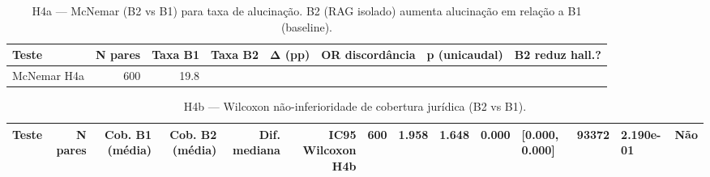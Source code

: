 \begin{table}[htbp]
\centering
\caption{H4a — McNemar (B2 vs B1) para taxa de alucinação. B2 (RAG isolado) aumenta alucinação em relação a B1 (baseline).}
\label{tab:t6_h4a_mcnemar}
\small
\begin{tabular}{lrrrrrrr}
\toprule
Teste & N pares & Taxa B1 & Taxa B2 & Δ (pp) & OR discordância & p (unicaudal) & B2 reduz hall.? \\
\midrule
McNemar H4a & 600 & 19.8%
\bottomrule
\end{tabular}
\end{table}

\begin{table}[htbp]
\centering
\caption{H4b — Wilcoxon não-inferioridade de cobertura jurídica (B2 vs B1).}
\label{tab:t6_h4b_wilcoxon}
\small
\begin{tabular}{lrrrrrrrr}
\toprule
Teste & N pares & Cob. B1 (média) & Cob. B2 (média) & Dif. mediana & IC95%
\midrule
Wilcoxon H4b & 600 & 1.958 & 1.648 & 0.000 & [0.000, 0.000] & 93372 & 2.190e-01 & Não \\
\bottomrule
\end{tabular}
\end{table}
